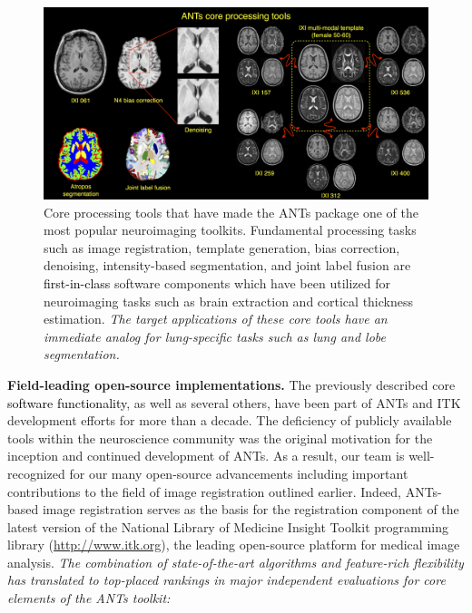 \documentclass[11pt,]{article}
\begin{document}
\begin{figure}[htbp]
\centering
\includegraphics{Figs/coreANtsToolsNeuro.png}
\caption{Core processing tools that have made the ANTs package one of
the most popular neuroimaging toolkits. Fundamental processing tasks
such as image registration, template generation, bias correction,
denoising, intensity-based segmentation, and joint label fusion are
\textcolor{black}{first-in-class} software components which have been
utilized for neuroimaging tasks such as brain extraction and cortical
thickness estimation. \emph{The target applications of these core tools
have an immediate analog for lung-specific tasks such as lung and lobe
segmentation.}}
\end{figure}

\textbf{Field-leading open-source implementations.} The previously
described core \textcolor{black}{software
functionality}, as well as several others, have been part of ANTs and
ITK development efforts for more than a decade. The deficiency of
publicly available tools within the neuroscience community was the
original motivation for the inception and continued development of ANTs.
As a result, our team is well-recognized for our many open-source
advancements including important contributions to the field of image
registration outlined earlier. Indeed, ANTs-based image registration
serves as the basis for the registration component of the latest version
of the National Library of Medicine Insight Toolkit programming library
(\url{http://www.itk.org}), the leading open-source platform for medical
image analysis. \emph{The combination of state-of-the-art algorithms and
feature-rich flexibility has translated to top-placed rankings in major
independent evaluations for core elements of the ANTs toolkit:}
\end{document}
